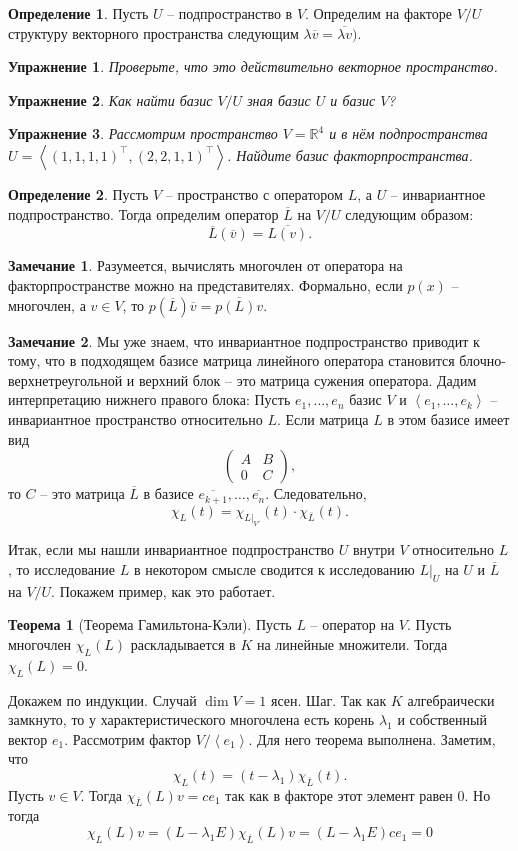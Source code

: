 \documentclass[10pt,a4paper,oneside]{book}
\newtheorem{uprz}{\color{violet!100!black} Упражнение}
\theoremstyle{definition}
\newtheorem*{rem}{\color{green!50!blue}Замечание}
\newtheorem*{defn}{\color{yellow!30!red} Определение}
\newtheorem{thm}{\color{red!40!black}Теорема}
\newcommand{\mb}[1]{\mathbb{#1}}
\newcommand{\ovl}{\overline}
\def\lan{\left\langle }
\def\ran{\right\rangle}
\def\thrm{\begin{thm}}
\def\ethrm{\end{thm}}
\def\dfn{\begin{defn}}
\def\edfn{\end{defn}}
\def\rm{\begin{rem}}
\def\erm{\end{rem}}
\def\pmat{\begin{pmatrix}}
\def\epmat{\end{pmatrix}}
\def\upr{\begin{uprz}}
\def\eupr{\end{uprz}}
\begin{document}
\dfn Пусть $U$ -- подпространство в $V$. Определим на факторе $V/U$ структуру векторного пространства следующим $\lambda \ovl{v}=\ovl{\lambda v})$.
\edfn

\upr Проверьте, что это действительно векторное пространство.
\eupr

\upr Как найти базис $V/U$ зная базис $U$ и базис $V$?
\eupr

\upr Рассмотрим пространство $V=\mb R^4$ и в нём подпространства $U=\lan (1,1,1,1)^\top, (2,2,1,1)^\top \ran$. Найдите базис факторпространства.
\eupr


\dfn Пусть $V$ -- пространство с оператором $L$, а $U$ -- инвариантное подпространство. Тогда определим оператор $\ovl{L}$ на $V/U$ следующим образом:
$$\ovl{L}(\ovl{v})=\ovl{L(v)}.$$
\edfn

\rm Разумеется, вычислять многочлен от оператора на факторпространстве можно на представителях. Формально, если $p(x)$ -- многочлен, а $v\in V$, то $p(\ovl{L})\ovl{v}=\ovl{p(L)v}$.
\erm

\rm Мы уже знаем, что инвариантное подпространство приводит к тому, что в подходящем базисе матрица линейного оператора становится блочно-верхнетреугольной и верхний блок -- это матрица сужения оператора. Дадим интерпретацию нижнего правого блока:  Пусть $e_1,\dots,e_n$ базис $V$ и $\lan e_1,\dots,e_k\ran$ -- инвариантное пространство относительно $L$. Если  матрица $L$ в этом базисе имеет вид $$\pmat A& B \\ 0 & C\epmat,$$
то $C$ -- это матрица $\ovl{L}$ в базисе
$\ovl{e_{k+1}},\dots,\ovl{e_n}$.
Следовательно, $$\chi_L(t)=\chi_{L|_{V'}}(t)\cdot \chi_{\ovl{L}}(t).$$
\erm

Итак, если мы нашли инвариантное подпространство $U$ внутри $V$ относительно $L$, то исследование $L$ в некотором смысле сводится к исследованию $L|_U$ на  $U$ и $\ovl{L}$ на $V/U$. Покажем пример, как это работает.


\thrm[Теорема Гамильтона-Кэли] Пусть $L$ -- оператор на $V$. Пусть многочлен $\chi_L(L)$ раскладывается в $K$ на линейные множители. Тогда $\chi_L(L)=0$.
\ethrm
\proof Докажем по индукции. Случай $\dim V=1$ ясен. Шаг. Так как $K$ алгебраически замкнуто, то у характеристического многочлена есть корень $\lambda_1$ и собственный вектор $e_1$. Рассмотрим фактор $V/\lan e_1\ran$. Для него теорема выполнена. Заметим, что $$\chi_L(t)= (t-\lambda_1)\chi_{\ovl{L}}(t).$$
Пусть $v \in V$. Тогда $\chi_{\ovl{L}}(L)v = ce_1$ так как в факторе этот элемент равен 0. Но тогда
$$\chi_L(L)v= (L-\lambda_1 E)\chi_{\ovl{L}}(L)v=(L-\lambda_1 E) ce_1=0$$
\endproof
\end{document}

